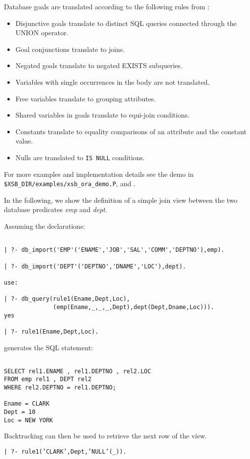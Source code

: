 Database goals are translated according to the following rules
from \cite{Drax92}:
\begin{itemize}
\item Disjunctive goals translate to distinct SQL queries
	connected through the UNION operator.
\item Goal conjunctions translate to joins.
\item Negated goals translate to negated EXISTS subqueries.
\item Variables with single occurrences in the body are not
	  translated.
\item Free variables translate to grouping attributes.
\item Shared variables in goals translate to equi-join conditions.
\item Constants translate to equality comparisons of an attribute and
	  the constant value.
\item Nulls are translated to {\tt IS NULL} conditions.
\end{itemize}
For more examples and implementation details see the demo in 
{\tt \$XSB\_DIR/examples/xsb\_ora\_demo.P}, and \cite{Drax92}.
 
In the following, we show the definition of a simple join view between the 
two database predicates {\it emp} and {\it dept}.

Assuming the declarations:
\begin{verbatim}

| ?- db_import('EMP'('ENAME','JOB','SAL','COMM','DEPTNO'),emp).

| ?- db_import('DEPT'('DEPTNO','DNAME','LOC'),dept).

use:
	
| ?- db_query(rule1(Ename,Dept,Loc),
	          (emp(Ename,_,_,_,Dept),dept(Dept,Dname,Loc))).
yes

| ?- rule1(Ename,Dept,Loc).
\end{verbatim}

generates the SQL statement:
\begin{verbatim}

SELECT rel1.ENAME , rel1.DEPTNO , rel2.LOC
FROM emp rel1 , DEPT rel2
WHERE rel2.DEPTNO = rel1.DEPTNO;

Ename = CLARK
Dept = 10
Loc = NEW YORK
\end{verbatim}

Backtracking can then be used to retrieve the next row of the view.
\begin{center}

{\tt | ?- rule1('CLARK',Dept,'NULL'(\_)).}
\end{center}

